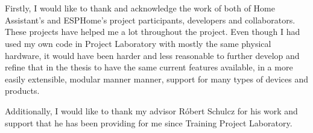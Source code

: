 \chapter*{\koszonetnyilvanitas}


Firstly, I would like to thank and acknowledge the work of both of Home Assistant's and ESPHome's project participants, developers and collaborators. These projects have helped me a lot throughout the project. Even though I had used my own code in Project Laboratory with mostly the same physical hardware, it would have been harder and less reasonable to further develop and refine that in the thesis to have the same current features available, in a more easily extensible, modular manner manner, support for many types of devices and products. \break

Additionally, I would like to thank my advisor Róbert Schulcz for his work and support that he has been providing for me since Training Project Laboratory.

